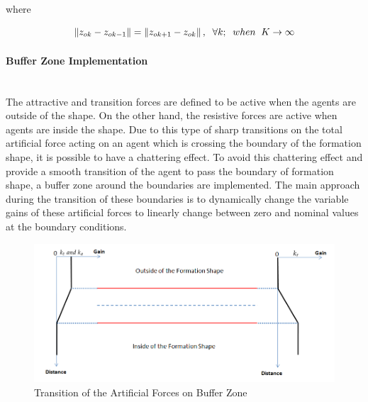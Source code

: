 where

\begin{equation}
\left\lVert z_{ok}- z_{ok -1}\right\rVert = \left\lVert z_{ok+1} - z_{ok}\right\rVert, \hspace{0.2cm}  \forall k ;  \hspace{0.2cm} when  \hspace{0.2cm} K \to\infty
\end{equation}
			
\paragraph{Buffer Zone Implementation}\hspace{0pt} \\
The attractive and transition forces are defined to be active when the agents are outside of the shape. On the other hand, the resistive forces are active when agents are inside the shape. Due to this type of sharp transitions on the total artificial force acting on an agent which is crossing the boundary of the formation shape, it is possible to have a chattering effect. To avoid this chattering effect and provide a smooth transition of the agent to pass the boundary of formation shape, a buffer zone around the boundaries are implemented. The main approach during the transition of these boundaries is to dynamically change the variable gains of these artificial forces to linearly change between zero and nominal values at the boundary conditions. 
     
\begin{figure}[H]
\caption{Transition of the Artificial Forces on Buffer Zone}
\centering
\includegraphics[scale = 0.50]{buffer_zone}
\end{figure}
			
			
